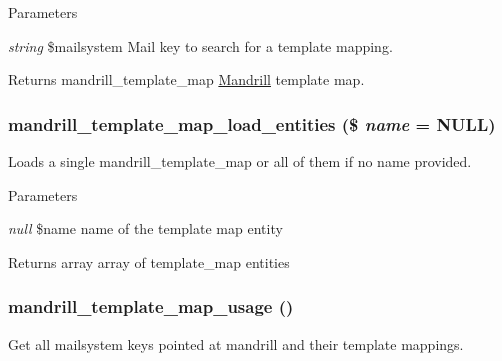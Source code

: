 \begin{DoxyParams}{Parameters}
\item[{\em string}]\$mailsystem Mail key to search for a template mapping.\end{DoxyParams}
\begin{DoxyReturn}{Returns}
mandrill\_\-template\_\-map \hyperlink{classMandrill}{Mandrill} template map. 
\end{DoxyReturn}
\hypertarget{mandrill__template_8module_aa010cdfe57b90112df7d15324437e978}{
\subsubsection[{mandrill\_\-template\_\-map\_\-load\_\-entities}]{\setlength{\rightskip}{0pt plus 5cm}mandrill\_\-template\_\-map\_\-load\_\-entities (\$ {\em name} = {\ttfamily NULL})}}
\label{mandrill__template_8module_aa010cdfe57b90112df7d15324437e978}
Loads a single mandrill\_\-template\_\-map or all of them if no name provided.


\begin{DoxyParams}{Parameters}
\item[{\em null}]\$name name of the template map entity\end{DoxyParams}
\begin{DoxyReturn}{Returns}
array array of template\_\-map entities 
\end{DoxyReturn}
\hypertarget{mandrill__template_8module_abcdfe09006615253c14cfaf0fe035ade}{
\subsubsection[{mandrill\_\-template\_\-map\_\-usage}]{\setlength{\rightskip}{0pt plus 5cm}mandrill\_\-template\_\-map\_\-usage ()}}
\label{mandrill__template_8module_abcdfe09006615253c14cfaf0fe035ade}
Get all mailsystem keys pointed at mandrill and their template mappings.

